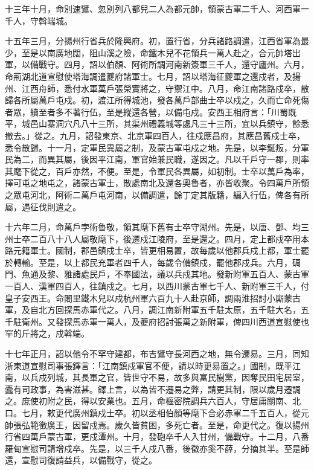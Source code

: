 \begin{pinyinscope}
 十三年十月，命別速鷿、忽別列八都兒二人為都元帥，領蒙古軍二千人、河西軍一千人，守斡端城。



 十五年三月，分揚州行省兵於隆興府。初，置行省，分兵諸路調遣，江西省軍為最少，至是以南廣地闊，阻山溪之險，命鐵木兒不花領兵一萬人赴之，合元帥塔出軍，以備戰守。四月，詔以伯顏、阿術所調河南新簽軍三千人，還守廬州。六月，命荊湖北道宣慰使塔海調遣夔府諸軍士。七月，詔以塔海征夔軍之還戍者，及揚州、江西舟師，悉付水軍萬戶張榮實將之，守禦江中。八月，命江南諸路戍卒，散歸各所屬萬戶屯戍。初，渡江所得城池，發各萬戶部曲士卒以戍之，久而亡命死傷者眾，續至者多不著行伍，至是縱還各營，以備屯戍。安西王相府言：「川蜀既平，城邑山寨洞穴凡八十三所，其渠州禮義城等處凡三十三所，宜以兵鎮守，餘悉撤去。」從之。九月，詔發東京、北京軍四百人，往戍應昌府，其應昌舊戍士卒，悉令散歸。十一月，定軍民異屬之制，及蒙古軍屯戍之地。先是，以李鋋叛，分軍民為二，而異其屬，後因平江南，軍官始兼民職，遂因之。凡以千戶守一郡，則率其麾下從之，百戶亦然，不便。至是，令軍民各異屬，如初制。士卒以萬戶為率，擇可屯之地屯之，諸蒙古軍士，散處南北及還各奧魯者，亦皆收聚。令四萬戶所領之眾屯河北，阿術二萬戶屯河南，以備調遣，餘丁定其版籍，編入行伍，俾各有所屬，遇征伐則遣之。



 十六年二月，命萬戶孛術魯敬，領其麾下舊有士卒守湖州。先是，以唐、鄧、均三州士卒二百八十八人屬敬麾下，後遷戍江陵府，至是還之。四月，定上都戍卒用本路元籍軍士。國制，郡邑鎮戍士卒，皆更相易置，故每歲以他郡兵戍上都，軍士罷於轉輸。至是，以上都民充軍者四千人，每歲令備鎮戍，罷他郡戍兵。六月，碉門、魚通及黎、雅諸處民戶，不奉國法，議以兵戍其地。發新附軍五百人、蒙古軍一百人、漢軍四百人，往鎮戍之。七月，以西川蒙古軍七千人、新附軍三千人，付皇子安西王。命闍里鐵木兒以戍杭州軍六百九十人赴京師，調兩淮招討小廝蒙古軍，及自北方回探馬赤軍代之。八月，調江南新附軍五千駐太原，五千駐大名，五千駐衛州。又發探馬赤軍一萬人，及夔府招討張萬之新附軍，俾四川西道宣慰使也罕的斤將之，戍斡端。



 十七年正月，詔以他令不罕守建都，布吉鷿守長河西之地，無令遷易。三月，同知浙東道宣慰司事張鐸言：「江南鎮戍軍官不便，請以時更易置之。」國制，既平江南，以兵戍列城，其長軍之官，皆世守不易，故多與富民樹黨，因奪民田宅居室，蠹有司政事，為害滋甚。鐸上言，以為皆不遷易之弊，請更其制，限以歲月遷調之。庶使初附之民，得以安業也。五月，命樞密院調兵六百人，守居庸關南、北口。七月，敕更代廣州鎮戍士卒。初以丞相伯顏等麾下合必赤軍二千五百人，從元帥張弘範徵廣王，因留戍焉。歲久皆貧困，多死亡者。至是，命更代之。復以揚州行省四萬戶蒙古軍，更戍潭州。十月，發砲卒千人入甘州，備戰守。十二月，八番羅甸宣慰司請增戍卒。先是，以三千人戍八番，後徵亦奚不薛，分摘其半。至是師還，宣慰司復請益兵，以備戰守，從之。




\end{pinyinscope}
